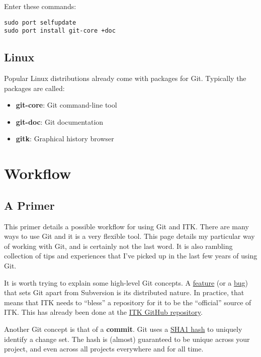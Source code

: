 Enter these commands:

\begin{verbatim}
sudo port selfupdate
sudo port install git-core +doc
\end{verbatim}


\subsection{Linux}
\label{subsec:Linux}

Popular Linux distributions already come with packages for Git. Typically the packages are called:
\begin{itemize}
\item \textbf{git-core}: Git command-line tool
\item \textbf{git-doc}: Git documentation
\item \textbf{gitk}: Graphical history browser
\end{itemize}


\section{Workflow}
\label{sec:Workflow}

\subsection{A Primer}
\label{subsec:APrimer}

This primer details a possible workflow for using Git and ITK. There are many
ways to use Git and it is a very flexible tool. This page details my particular
way of working with Git, and is certainly not the last word. It is also
rambling collection of tips and experiences that I've picked up in the last
few years of using Git.

It is worth trying to explain some high-level Git concepts. A
\href{https://carthik.net/blog/vault/2007/08/21/its-a-feature-not-a-bug/}{feature}
(or a
\href{https://blog.codinghorror.com/thats-not-a-bug-its-a-feature-request/}{bug})
that sets Git apart from Subversion is its distributed nature. In practice,
that means that ITK needs to ``bless'' a repository for it to be the
``official'' source of ITK. This has already been done at the
\href{https://github.com/InsightSoftwareConsortium/ITK}{ITK GitHub repository}.

Another Git concept is that of a \textbf{commit}. Git uses a
\href{https://en.wikipedia.org/wiki/SHA-1}{SHA1 hash} to uniquely identify a
change set. The hash is (almost) guaranteed to be unique across your project,
and even across all projects everywhere and for all time.

